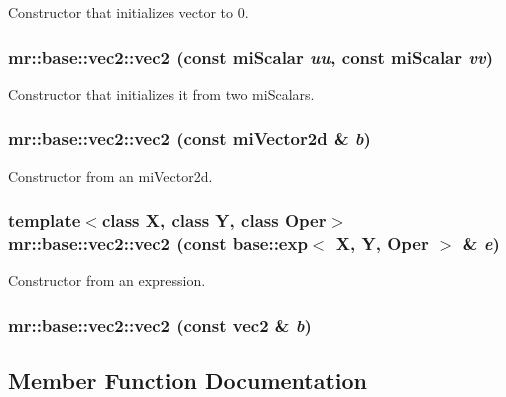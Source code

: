 Constructor that initializes vector to 0. 

\subsubsection{\setlength{\rightskip}{0pt plus 5cm}mr::base::vec2::vec2 (const mi\-Scalar {\em uu}, const mi\-Scalar {\em vv})\hspace{0.3cm}{\tt  [inline]}}\label{structmr_1_1base_1_1vec2_z45_2}


Constructor that initializes it from two mi\-Scalars. 

\subsubsection{\setlength{\rightskip}{0pt plus 5cm}mr::base::vec2::vec2 (const mi\-Vector2d \& {\em b})\hspace{0.3cm}{\tt  [inline]}}\label{structmr_1_1base_1_1vec2_z45_3}


Constructor from an mi\-Vector2d. 

\subsubsection{\setlength{\rightskip}{0pt plus 5cm}template$<$class X, class Y, class Oper$>$ mr::base::vec2::vec2 (const {\bf base::exp}$<$ X, Y, Oper $>$ \& {\em e})\hspace{0.3cm}{\tt  [inline]}}\label{structmr_1_1base_1_1vec2_z45_4}


Constructor from an expression. 

\subsubsection{\setlength{\rightskip}{0pt plus 5cm}mr::base::vec2::vec2 (const {\bf vec2} \& {\em b})\hspace{0.3cm}{\tt  [inline]}}\label{structmr_1_1base_1_1vec2_z46_0}




\subsection{Member Function Documentation}
